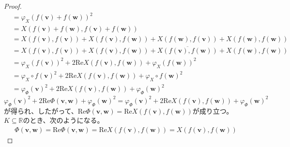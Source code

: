 \documentclass[dvipdfmx]{jsarticle}
\begin{document}
\begin{proof}
\begin{align*}
&= {\varphi_{X}\left( f\left( \mathbf{v} \right) + f\left( \mathbf{w} \right) \right)}^{2}\\
&= X\left( f\left( \mathbf{v} \right) + f\left( \mathbf{w} \right),f\left( \mathbf{v} \right) + f\left( \mathbf{w} \right) \right)\\
&= X\left( f\left( \mathbf{v} \right),f\left( \mathbf{v} \right) \right) + X\left( f\left( \mathbf{v} \right),f\left( \mathbf{w} \right) \right) + X\left( f\left( \mathbf{w} \right),f\left( \mathbf{v} \right) \right) + X\left( f\left( \mathbf{w} \right),f\left( \mathbf{w} \right) \right)\\
&= X\left( f\left( \mathbf{v} \right),f\left( \mathbf{v} \right) \right) + X\left( f\left( \mathbf{v} \right),f\left( \mathbf{w} \right) \right) + \overline{X\left( f\left( \mathbf{v} \right),f\left( \mathbf{w} \right) \right)} + X\left( f\left( \mathbf{w} \right),f\left( \mathbf{w} \right) \right)\\
&= {\varphi_{X}\left( f\left( \mathbf{v} \right) \right)}^{2} + 2\mathrm{Re}{X\left( f\left( \mathbf{v} \right),f\left( \mathbf{w} \right) \right)} + {\varphi_{X}\left( f\left( \mathbf{w} \right) \right)}^{2}\\
&= {\varphi_{X} \circ f\left( \mathbf{v} \right)}^{2} + 2\mathrm{Re}{X\left( f\left( \mathbf{v} \right),f\left( \mathbf{w} \right) \right)} + {\varphi_{X} \circ f\left( \mathbf{w} \right)}^{2}\\
&= {\varphi_{\varPhi }\left( \mathbf{v} \right)}^{2} + 2\mathrm{Re}{X\left( f\left( \mathbf{v} \right),f\left( \mathbf{w} \right) \right)} + {\varphi_{\varPhi }\left( \mathbf{w} \right)}^{2}
\end{align*}
${\varphi_{\varPhi }\left( \mathbf{v} \right)}^{2} + 2\mathrm{Re}{\varPhi \left( \mathbf{v},\mathbf{w} \right)} + {\varphi_{\varPhi }\left( \mathbf{w} \right)}^{2} = {\varphi_{\varPhi }\left( \mathbf{v} \right)}^{2} + 2\mathrm{Re}{X\left( f\left( \mathbf{v} \right),f\left( \mathbf{w} \right) \right)} + {\varphi_{\varPhi }\left( \mathbf{w} \right)}^{2}$が得られ、したがって、$\mathrm{Re}{\varPhi \left( \mathbf{v},\mathbf{w} \right)} = \mathrm{Re}{X\left( f\left( \mathbf{v} \right),f\left( \mathbf{w} \right) \right)}$が成り立つ。$K \subseteq \mathbb{R}$のとき、次のようになる。
\begin{align*}
\varPhi \left( \mathbf{v},\mathbf{w} \right) = \mathrm{Re}{\varPhi \left( \mathbf{v},\mathbf{w} \right)} = \mathrm{Re}{X\left( f\left( \mathbf{v} \right),f\left( \mathbf{w} \right) \right)} = X\left( f\left( \mathbf{v} \right),f\left( \mathbf{w} \right) \right)

\end{align*}
\end{proof}
\end{document}
